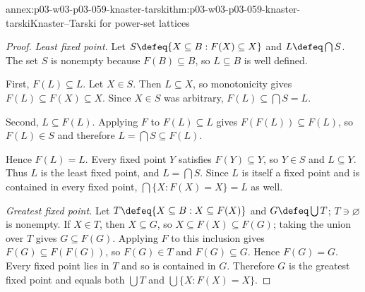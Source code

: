 \begin{annexitem}{annex:p03-w03-p03-059-knaster-tarski}{thm:p03-w03-p03-059-knaster-tarski}{Knaster--Tarski for power-set lattices}
\begin{proof}
\emph{Least fixed point.} Let \(S\defeq\{X\subseteq B:F(X)\subseteq X\}\)
and \(L\defeq\bigcap S\). The set \(S\) is nonempty because
\(F(B)\subseteq B\), so \(L\subseteq B\) is well defined.

First, \(F(L)\subseteq L\). Let \(X\in S\). Then \(L\subseteq X\), so
monotonicity gives \(F(L)\subseteq F(X)\subseteq X\). Since \(X\in S\) was
arbitrary, \(F(L)\subseteq\bigcap S=L\).

Second, \(L\subseteq F(L)\). Applying \(F\) to \(F(L)\subseteq L\) gives
\(F(F(L))\subseteq F(L)\), so \(F(L)\in S\) and therefore
\(L=\bigcap S\subseteq F(L)\).

Hence \(F(L)=L\). Every fixed point \(Y\) satisfies
\(F(Y)\subseteq Y\), so \(Y\in S\) and \(L\subseteq Y\). Thus \(L\) is the
least fixed point, and \(L=\bigcap S\). Since \(L\) is itself a fixed
point and is contained in every fixed point,
\(\bigcap\{X:F(X)=X\}=L\) as well.

\emph{Greatest fixed point.} Let \(T\defeq\{X\subseteq B:X\subseteq F(X)\}\)
and \(G\defeq\bigcup T\); \(T\ni\varnothing\) is nonempty. If \(X\in T\),
then \(X\subseteq G\), so \(X\subseteq F(X)\subseteq F(G)\); taking the
union over \(T\) gives \(G\subseteq F(G)\). Applying \(F\) to this
inclusion gives \(F(G)\subseteq F(F(G))\), so \(F(G)\in T\) and
\(F(G)\subseteq G\). Hence \(F(G)=G\). Every fixed point lies in \(T\) and
so is contained in \(G\). Therefore \(G\) is the greatest fixed point and
equals both \(\bigcup T\) and \(\bigcup\{X:F(X)=X\}\).
\end{proof}
\end{annexitem}

